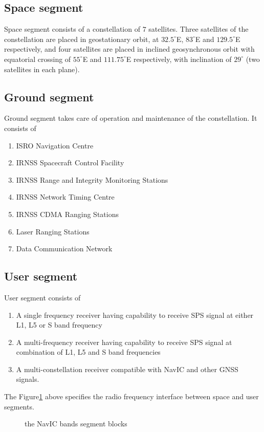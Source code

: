 \subsection{Space segment}
Space segment consists of a constellation of $7$ satellites. Three satellites of the constellation are placed in geostationary orbit, at $32.5^{\circ}$E, $83^{\circ}$E and $129.5^{\circ}$E respectively, and four satellites are placed in inclined geosynchronous orbit with equatorial crossing of $55^{\circ}$E and $111.75^{\circ}$E respectively, with inclination of $29^{\circ}$ (two satellites in each plane).

\subsection{Ground segment}
Ground segment takes care of operation and maintenance of the constellation. It consists of 
\begin{enumerate}
	\item ISRO Navigation Centre
	\item IRNSS Spacecraft Control Facility
	\item IRNSS Range and Integrity Monitoring Stations
	\item IRNSS Network Timing Centre
	\item IRNSS CDMA Ranging Stations
	\item Laser Ranging Stations
	\item Data Communication Network
\end{enumerate}

\subsection{User segment}
User segment consists of 
\begin{enumerate}
	\item A single frequency receiver having capability to receive SPS signal at either L1, L5 or S band frequency
	\item A multi-frequency receiver having capability to receive SPS signal at combination of L1, L5 and S band frequencies
	\item A multi-constellation receiver compatible with NavIC and other GNSS signals.
\end{enumerate}
\noindent The Figure\ref{figs:bandsfig} above specifies the radio frequency interface between space and user segments.

	\begin{figure}[!ht]
	\centering
	
	\caption{the NavIC bands segment blocks}
	\label{figs:bandsfig}
	\end{figure}

